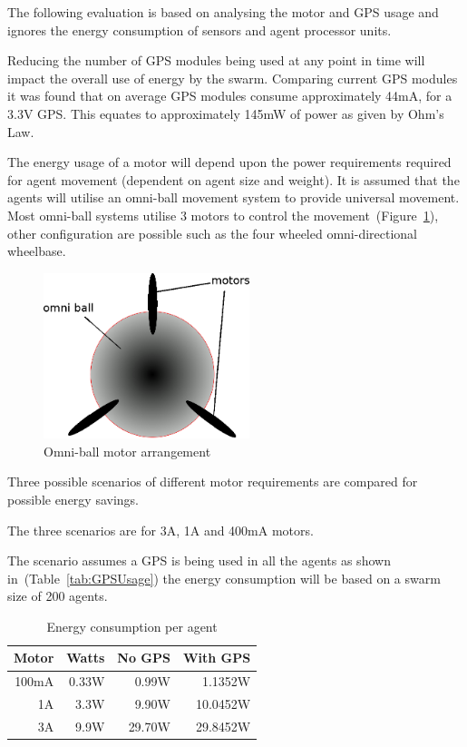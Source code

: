 The following evaluation is based on analysing the motor and GPS usage and ignores the energy consumption of sensors and agent processor units.

Reducing the number of GPS modules being used at any point in time will impact the overall use of energy by the swarm. Comparing current GPS modules it was found that on average GPS modules consume approximately 44mA, for a 3.3V GPS. This equates to approximately 145mW of power as given by Ohm's Law. 


The energy usage of a motor will depend upon the power requirements required for agent movement (dependent on agent size and weight). It is assumed that the agents will utilise an omni-ball movement system to provide universal movement. Most omni-ball systems utilise 3 motors to control the movement~(Figure~\ref{fig:OmniBall}), other configuration are possible such as the four wheeled omni-directional wheelbase\cite{PD:06}.

\begin{figure}[H]
\begin{center}
\includegraphics[width=6cm]{CHAPTER-6/figures/OmniBall}
\end{center}
\caption{Omni-ball motor arrangement \label{fig:OmniBall}}
\end{figure}

Three possible scenarios of different motor requirements are compared for possible energy savings.

The three scenarios are for 3A, 1A and 400mA motors.

The scenario assumes a GPS is being used in all the agents as shown in~(Table~\ref{tab:GPSUsage}) the energy consumption will be based on a swarm size of 200 agents.

\begin{table}[H]
\begin{center}
\begin{tabular}{| r | r | r | r |}
\hline
Motor & Watts  & No GPS & With GPS \\ \hline
100mA &  0.33W &  0.99W & 1.1352W\\ \hline
1A    &  3.3W  &  9.90W & 10.0452W\\ \hline
3A    &  9.9W  & 29.70W & 29.8452W\\ \hline
\end{tabular}\caption{Energy consumption per agent} \label{tab:Energy1}
\end{center}
\end{table}


